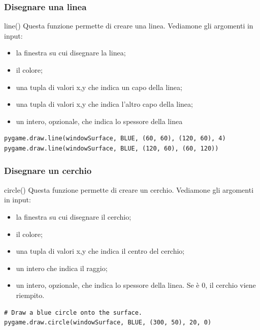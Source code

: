 \documentclass{beamer}
\begin{document}
\begin{frame}[fragile]
\frametitle{Disegnare una linea}
\begin{block}{line()}
	Questa funzione permette di creare una linea. Vediamone gli argomenti in input:
	\begin{itemize}
		\item la finestra su cui disegnare la linea;
		\item il colore;
		\item una tupla di valori x,y che indica un capo della linea;
		\item una tupla di valori x,y che indica l'altro capo della linea;
		\item un intero, opzionale, che indica lo spessore della linea
	\end{itemize}
\end{block}
\begin{lstlisting}
pygame.draw.line(windowSurface, BLUE, (60, 60), (120, 60), 4)
pygame.draw.line(windowSurface, BLUE, (120, 60), (60, 120))

\end{lstlisting}
\end{frame}


\begin{frame}[fragile]
\frametitle{Disegnare un cerchio}
\begin{block}{circle()}
	Questa funzione permette di creare un cerchio. Vediamone gli argomenti in input:
	\begin{itemize}
		\item la finestra su cui disegnare il cerchio;
		\item il colore;
		\item una tupla di valori x,y che indica il centro del cerchio;
		\item un intero che indica il raggio;
		\item un intero, opzionale, che indica lo spessore della linea. Se è 0, il cerchio viene riempito.
	\end{itemize}
\end{block}
\begin{lstlisting}
# Draw a blue circle onto the surface.
pygame.draw.circle(windowSurface, BLUE, (300, 50), 20, 0)

\end{lstlisting}
\end{frame}
\end{document}
